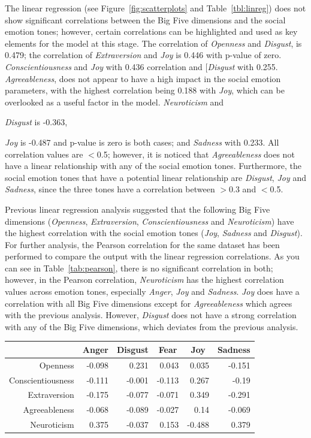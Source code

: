 \documentclass[graybox]{svmult}
\begin{document}
{The linear regression (see Figure~\ref{fig:scatterplots} and
Table~\ref{tbl:linreg}) does not show significant correlations
between the Big Five dimensions and the social emotion tones; however,
certain correlations can be highlighted and used as key elements for
the model at this stage. The correlation of {\emph{Openness} and
{\emph{Disgust}}, is 0.479; the correlation of {\emph{Extraversion}}
and {\emph{Joy}} is 0.446 with p-value of
zero. {\emph{Conscientiousness}} and {\emph{Joy}} with 0.436
correlation and [\emph{Disgust}} with 0.255. {\emph{Agreeableness}},
does not appear to have a high impact in the social emotion
parameters, with the highest correlation being 0.188 with
{\emph{Joy}}, which can be overlooked as a useful factor in the
model. {\emph{Neuroticism}} and {\emph{Disgust} is -0.363, {\emph{Joy}
is -0.487 and p-value is zero is both cases; and {\emph{Sadness}} with
0.233. All correlation values are $<$0.5; however, it is noticed that
{\emph{Agreeableness}} does not have a linear relationship with any of
the social emotion tones. Furthermore, the social emotion tones that
have a potential linear relationship are {\emph{Disgust}},
{\emph{Joy}} and {\emph{Sadness}}, since the three tones have a
correlation between $>$0.3 and $<$0.5.

Previous linear regression analysis suggested that the following Big
Five dimensions ({\emph{Openness}}, {\emph{Extraversion}},
{\emph{Conscientiousness}} and {\emph{Neuroticism}}) have the highest
correlation with the social emotion tones ({\emph{Joy}},
{\emph{Sadness}} and {\emph{Disgust}}). For further analysis, the
Pearson correlation for the same dataset has been performed to compare
the output with the linear regression correlations. As you can see in
Table~\ref{tab:pearson}, there is no significant correlation in both;
however, in the Pearson correlation, {\emph{Neuroticism}} has the
highest correlation values across emotion tones, especially
{\emph{Anger}}, {\emph{Joy}} and {\emph{Sadness}}. {\emph{Joy}} does
have a correlation with all Big Five dimensions except for
{\emph{Agreeableness}} which agrees with the previous
analysis. However, {\emph{Disgust}} does not have a strong correlation
with any of the Big Five dimensions, which deviates from the previous
analysis.

\begin{table}[!ht]
\centering
\begin{tabular}{@{}rrrrrr@{}}
\toprule
                  & \multicolumn{1}{c}{Anger}  & \multicolumn{1}{c}{Disgust} & \multicolumn{1}{c}{Fear}   & \multicolumn{1}{c}{Joy}    & \multicolumn{1}{c}{Sadness} \\ 
\midrule
Openness          & -0.098 & 0.231   & 0.043  & 0.035  & -0.151  \\
Conscientiousness & -0.111 & -0.001  & -0.113 & 0.267  & -0.19   \\
Extraversion      & -0.175 & -0.077  & -0.071 & 0.349  & -0.291  \\
Agreeableness     & -0.068 & -0.089  & -0.027 & 0.14   & -0.069  \\
Neuroticism       & 0.375  & -0.037  & 0.153  & -0.488 & 0.379   \\ 


\end{tabular}
\end{table}}}}
\end{document}
